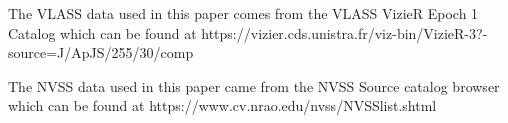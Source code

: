 \documentclass[a4paper,fleqn,usenatbib]{mnras}
\begin{document}
The VLASS data used in this paper comes from the VLASS VizieR Epoch 1 Catalog which can be found at https://vizier.cds.unistra.fr/viz-bin/VizieR-3?-source=J/ApJS/255/30/comp

The NVSS data used in this paper came from the NVSS Source catalog browser which can be found at https://www.cv.nrao.edu/nvss/NVSSlist.shtml





 


\bsp	%
\label{lastpage}
\end{document}
